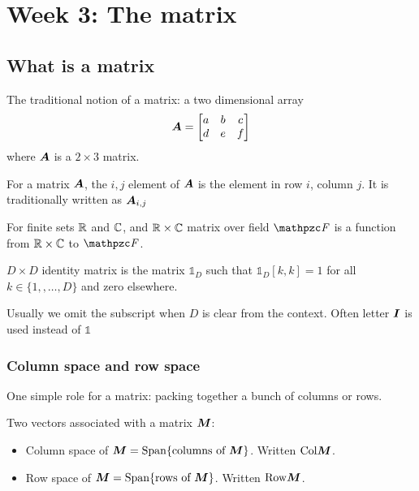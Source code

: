 \chapter{Week 3: The matrix}

\section{What is a matrix}
The traditional notion of a matrix: a two dimensional array
\begin{equation*}
  {\bm{A}} = 
  \begin{bmatrix}
    a & b & c \\
    d & e & f
  \end{bmatrix}
\end{equation*}
where ${\bm{A}}$ is a $2 \times 3$ matrix.

For a matrix ${\bm{A}}$, the $i, j$ element of ${\bm{A}}$ is the element in row $i$, column $j$. It is traditionally written as ${\bm{A}}_{i, j}$

\begin{definition}
  For finite sets ${\mathbb{R}}$ and ${\mathbb{C}}$, and ${\mathbb{R}} \times {\mathbb{C}}$ matrix over field $\fF$ is a function from ${\mathbb{R}} \times {\mathbb{C}}$ to $\fF$.
\end{definition}

\begin{definition}
  $D \times D$ identity matrix is the matrix $\mathds{1}_D$ such that $\mathds{1}_D[k, k] = 1$ for all $k \in \{1, , \ldots, D\}$ and zero elsewhere.
\end{definition}

Usually we omit the subscript when $D$ is clear from the context.
Often letter ${\bm{I}}$ is used instead of $\mathds{1}$

\subsection{Column space and row space}
One simple role for a matrix: packing together a bunch of columns or rows.
\begin{definition}
  Two vectors associated with a matrix ${\bm{M}}$:
  \begin{itemize}
  \item Column space of ${\bm{M}} = \mathrm{Span}\{\text{columns of }{\bm{M}}\}$. Written $\mathrm{Col} {\bm{M}}$.
  \item Row space of ${\bm{M}} = \mathrm{Span}\{\text{rows of }{\bm{M}}\}$. Written $\mathrm{Row} {\bm{M}}$.
  \end{itemize}
\end{definition}

